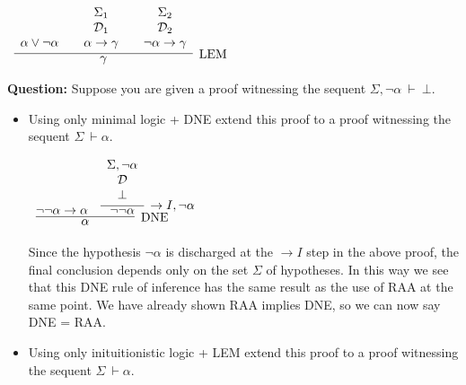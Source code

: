 \documentclass[11pt]{report}
\begin{document}
\begin{enumerate}
\begin{center}
\begin{minipage}{0.45\textwidth}
			$\begin{array}{ c }
			\infer[\text{LEM}]{\gamma}
			{
			\begin{array}{c} \  \\ \ \\ \alpha\lor\lnot\alpha \end{array}
			& 
			\begin{array}{c} \Sigma_{1}  \\ \mathcal{D}_{1} \\ \alpha\rightarrow\gamma \end{array}				
			& 
			\begin{array}{c} \Sigma_{2}  \\ \mathcal{D}_{2} \\ \lnot\alpha\rightarrow\gamma \end{array}				 
			}
			\end{array}$
		\end{minipage}
	\end{center}

	\textbf{Question:} Suppose you are given a proof witnessing the sequent $\Sigma, \lnot \alpha \ \vdash \ \bot$. 

	\begin{itemize}
		\item[(a)] Using only minimal logic + DNE extend this proof to a proof witnessing the sequent $ \Sigma \ \vdash \alpha$. 
		
		\begin{center}
			$\begin{array}{c}
				\infer[\DNE]{\alpha}
					{\lnot\lnot \alpha \to \alpha
					&
					\infer[\to I, \lnot \alpha]{\lnot \lnot \alpha}
						{\begin{array}{c} \Sigma, \lnot \alpha  \\ \mathcal{D} \\ \bot \end{array}}}
			\end{array}$
		\end{center}

		Since the hypothesis $\lnot \alpha$ is discharged at the $\to I$ step in the above proof, the final conclusion depends only on the set $\Sigma$ of hypotheses. In this way we see that this DNE rule of inference has the same result as the use of RAA at the same point. We have already shown RAA implies DNE, so we can now say DNE = RAA.


		\item[(b)] Using only inituitionistic logic + LEM extend this proof to a proof witnessing the sequent $ \Sigma \ \vdash \alpha$. 
		

\end{itemize}
\end{enumerate}
\end{document}
